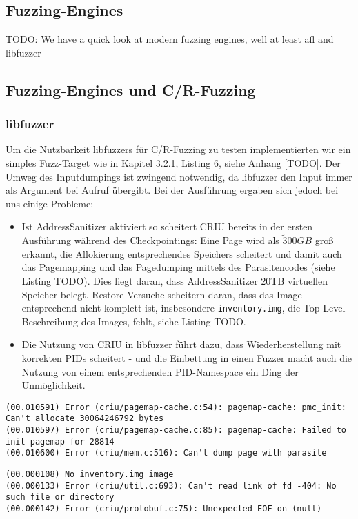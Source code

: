 \documentclass[a4paper]{article}
\begin{document}
\subsection{Fuzzing-Engines}
TODO: We have a quick look at modern fuzzing engines, well at least afl and libfuzzer\\
\subsection{Fuzzing-Engines und C/R-Fuzzing}
\subsubsection{libfuzzer}
Um die Nutzbarkeit libfuzzers für C/R-Fuzzing zu testen implementierten wir ein simples Fuzz-Target wie in Kapitel 3.2.1, Listing 6, siehe Anhang [TODO]. Der Umweg des Inputdumpings ist zwingend notwendig, da libfuzzer den Input immer als Argument bei Aufruf übergibt. Bei der Ausführung ergaben sich jedoch bei uns einige Probleme:
\begin{itemize}
    \item Ist AddressSanitizer aktiviert so scheitert CRIU bereits in der ersten Ausführung während des Checkpointings: Eine Page wird als $\tilde 300GB$ groß erkannt, die Allokierung entsprechendes Speichers scheitert und damit auch das Pagemapping und das Pagedumping mittels des Parasitencodes (siehe Listing TODO). Dies liegt daran, dass AddressSanitizer 20TB virtuellen Speicher belegt. Restore-Versuche scheitern daran, dass das Image entsprechend nicht komplett ist, insbesondere \texttt{inventory.img}, die Top-Level-Beschreibung des Images, fehlt, siehe Listing TODO. %
    \item Die Nutzung von CRIU in libfuzzer führt dazu, dass Wiederherstellung mit korrekten PIDs scheitert - und die Einbettung in einen Fuzzer macht auch die Nutzung von einem entsprechenden PID-Namespace ein Ding der Unmöglichkeit.
\end{itemize}
\begin{lstlisting}[caption=Pagemapping/dumping Errors mit ASan]
(00.010591) Error (criu/pagemap-cache.c:54): pagemap-cache: pmc_init: Can't allocate 30064246792 bytes
(00.010597) Error (criu/pagemap-cache.c:85): pagemap-cache: Failed to init pagemap for 28814
(00.010600) Error (criu/mem.c:516): Can't dump page with parasite
\end{lstlisting}
\begin{lstlisting}[caption=Restoring Error mit ASan]
(00.000108) No inventory.img image
(00.000133) Error (criu/util.c:693): Can't read link of fd -404: No such file or directory
(00.000142) Error (criu/protobuf.c:75): Unexpected EOF on (null)
\end{lstlisting}
\end{document}
